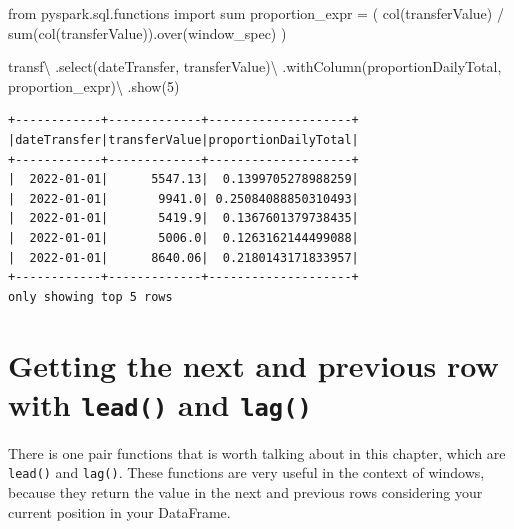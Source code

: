 \documentclass[
  11pt,
  letterpaper,
  DIV=11,
  numbers=noendperiod]{scrreprt}
\newenvironment{Shaded}{\begin{snugshade}}{\end{snugshade}}
\newcommand{\BuiltInTok}[1]{\textcolor[rgb]{0.00,0.23,0.31}{#1}}
\newcommand{\DecValTok}[1]{\textcolor[rgb]{0.68,0.00,0.00}{#1}}
\newcommand{\ImportTok}[1]{\textcolor[rgb]{0.00,0.46,0.62}{#1}}
\newcommand{\NormalTok}[1]{\textcolor[rgb]{0.00,0.23,0.31}{#1}}
\newcommand{\OperatorTok}[1]{\textcolor[rgb]{0.37,0.37,0.37}{#1}}
\newcommand{\StringTok}[1]{\textcolor[rgb]{0.13,0.47,0.30}{#1}}
\begin{document}
\begin{Shaded}
\begin{Highlighting}[]
\ImportTok{from}\NormalTok{ pyspark.sql.functions }\ImportTok{import} \BuiltInTok{sum}
\NormalTok{proportion\_expr }\OperatorTok{=}\NormalTok{ (}
\NormalTok{    col(}\StringTok{\textquotesingle{}transferValue\textquotesingle{}}\NormalTok{)}
    \OperatorTok{/} \BuiltInTok{sum}\NormalTok{(col(}\StringTok{\textquotesingle{}transferValue\textquotesingle{}}\NormalTok{)).over(window\_spec)}
\NormalTok{)}

\NormalTok{transf}\OperatorTok{\textbackslash{}}
\NormalTok{    .select(}\StringTok{\textquotesingle{}dateTransfer\textquotesingle{}}\NormalTok{, }\StringTok{\textquotesingle{}transferValue\textquotesingle{}}\NormalTok{)}\OperatorTok{\textbackslash{}}
\NormalTok{    .withColumn(}\StringTok{\textquotesingle{}proportionDailyTotal\textquotesingle{}}\NormalTok{, proportion\_expr)}\OperatorTok{\textbackslash{}}
\NormalTok{    .show(}\DecValTok{5}\NormalTok{)}
\end{Highlighting}
\end{Shaded}

\begin{verbatim}
+------------+-------------+--------------------+
|dateTransfer|transferValue|proportionDailyTotal|
+------------+-------------+--------------------+
|  2022-01-01|      5547.13|  0.1399705278988259|
|  2022-01-01|       9941.0| 0.25084088850310493|
|  2022-01-01|       5419.9|  0.1367601379738435|
|  2022-01-01|       5006.0|  0.1263162144499088|
|  2022-01-01|      8640.06|  0.2180143171833957|
+------------+-------------+--------------------+
only showing top 5 rows
\end{verbatim}

\hypertarget{getting-the-next-and-previous-row-with-lead-and-lag}{%
\section{\texorpdfstring{Getting the next and previous row with
\texttt{lead()} and
\texttt{lag()}}{Getting the next and previous row with lead() and lag()}}\label{getting-the-next-and-previous-row-with-lead-and-lag}}

There is one pair functions that is worth talking about in this chapter,
which are \texttt{lead()} and \texttt{lag()}. These functions are very
useful in the context of windows, because they return the value in the
next and previous rows considering your current position in your
DataFrame.
\end{document}
